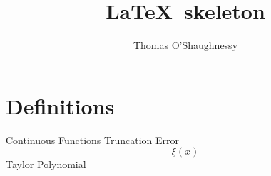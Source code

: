 \documentclass[12pt]{article}
\author{Thomas O'Shaughnessy}
\title{\LaTeX\ skeleton}
\begin{document}
\maketitle
\section{Definitions}

Continuous Functions
Truncation Error $$\xi (x)$$
Taylor Polynomial
\end{document}
